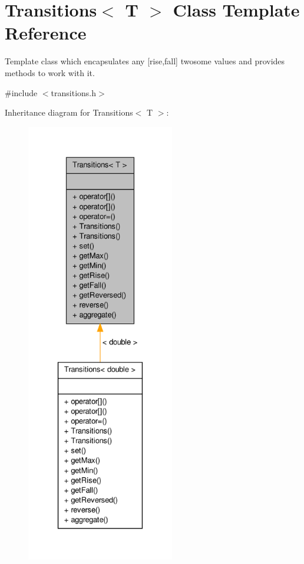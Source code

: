 \hypertarget{classTransitions}{\section{Transitions$<$ T $>$ Class Template Reference}
\label{classTransitions}
}


Template class which encapsulates any \mbox{[}rise,fall\mbox{]} twosome values and provides methods to work with it.  




{\ttfamily \#include $<$transitions.\-h$>$}



Inheritance diagram for Transitions$<$ T $>$\-:\nopagebreak
\begin{figure}[H]
\begin{center}
\leavevmode
\includegraphics[height=550pt]{classTransitions__inherit__graph}
\end{center}
\end{figure}


